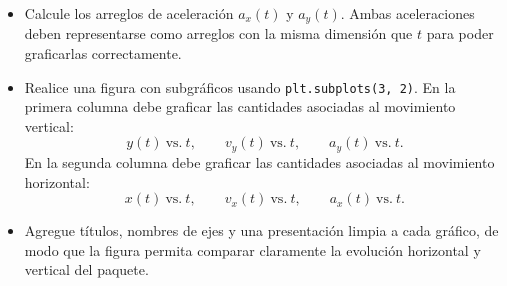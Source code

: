 \begin{tcolorbox}[colback=blue!2!white,colframe=blue!55!black,title={Enunciado},breakable]
\begin{itemize}
    \item[(e)] Calcule los arreglos de aceleración $a_x(t)$ y $a_y(t)$. Ambas aceleraciones deben representarse como arreglos con la misma dimensión que $t$ para poder graficarlas correctamente.

    \item[(f)] Realice una figura con subgráficos usando \texttt{plt.subplots(3, 2)}. En la primera columna debe graficar las cantidades asociadas al movimiento vertical:
    \[
    y(t) \ \text{vs.} \ t,
    \qquad
    v_y(t) \ \text{vs.} \ t,
    \qquad
    a_y(t) \ \text{vs.} \ t.
    \]
    En la segunda columna debe graficar las cantidades asociadas al movimiento horizontal:
    \[
    x(t) \ \text{vs.} \ t,
    \qquad
    v_x(t) \ \text{vs.} \ t,
    \qquad
    a_x(t) \ \text{vs.} \ t.
    \]

    \item[(g)] Agregue títulos, nombres de ejes y una presentación limpia a cada gráfico, de modo que la figura permita comparar claramente la evolución horizontal y vertical del paquete.
\end{itemize}
\end{tcolorbox}

